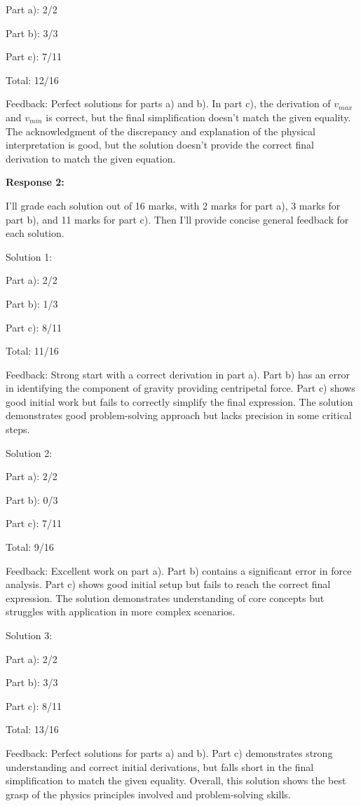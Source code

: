 \documentclass[a4paper,11pt]{article}
\begin{document}
Part a): 2/2

Part b): 3/3

Part c): 7/11

Total: 12/16

Feedback: Perfect solutions for parts a) and b). In part c), the derivation of \(v_{max}\) and \(v_{min}\) is correct, but the final simplification doesn't match the given equality. The acknowledgment of the discrepancy and explanation of the physical interpretation is good, but the solution doesn't provide the correct final derivation to match the given equation.

\bigskip
\textbf{Response 2:}

I'll grade each solution out of 16 marks, with 2 marks for part a), 3 marks for part b), and 11 marks for part c). Then I'll provide concise general feedback for each solution.

Solution 1:

Part a): 2/2

Part b): 1/3

Part c): 8/11

Total: 11/16

Feedback: Strong start with a correct derivation in part a). Part b) has an error in identifying the component of gravity providing centripetal force. Part c) shows good initial work but fails to correctly simplify the final expression. The solution demonstrates good problem-solving approach but lacks precision in some critical steps.

Solution 2:

Part a): 2/2

Part b): 0/3

Part c): 7/11

Total: 9/16

Feedback: Excellent work on part a). Part b) contains a significant error in force analysis. Part c) shows good initial setup but fails to reach the correct final expression. The solution demonstrates understanding of core concepts but struggles with application in more complex scenarios.

Solution 3:

Part a): 2/2

Part b): 3/3

Part c): 8/11

Total: 13/16

Feedback: Perfect solutions for parts a) and b). Part c) demonstrates strong understanding and correct initial derivations, but falls short in the final simplification to match the given equality. Overall, this solution shows the best grasp of the physics principles involved and problem-solving skills.
\end{document}
